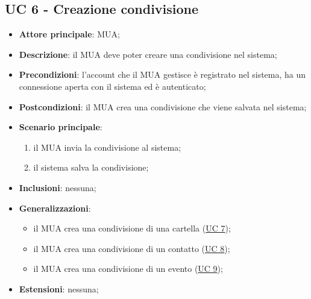\subsection{UC 6 - Creazione condivisione} \label{sec:UC6}
    \begin{itemize}
        \item \textbf{Attore principale}: MUA;
        \item \textbf{Descrizione}: il MUA deve poter creare una condivisione nel sistema;
        \item \textbf{Precondizioni}: l’account che il MUA gestisce è registrato nel sistema, ha un connessione aperta con il sistema ed è autenticato;
        \item \textbf{Postcondizioni}: il MUA crea una condivisione che viene salvata nel sistema;
        \item \textbf{Scenario principale}:
        \begin{enumerate}
            \item il MUA invia la condivisione al sistema;
            \item il sistema salva la condivisione;
        \end{enumerate}
    \item \textbf{Inclusioni}: nessuna;
    \item \textbf{Generalizzazioni}:
        \begin{itemize}
            \item il MUA crea una condivisione di una cartella (\hyperref[sec:UC7]{UC 7});
            \item il MUA crea una condivisione di un contatto (\hyperref[sec:UC8]{UC 8});
            \item il MUA crea una condivisione di un evento (\hyperref[sec:UC9]{UC 9});
        \end{itemize}
    \item \textbf{Estensioni}: nessuna;
\end{itemize}
